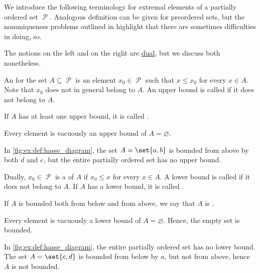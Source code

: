 \begin{definition}\label{def:partially_ordered_set_extremal_points}
  We introduce the following terminology for extremal elements of a partially ordered set \( \mscrP \). Analogous definition can be given for preordered sets, but the nonuniqueness problems outlined in  highlight that there are sometimes difficulties in doing, so.

  The notions on the left and on the right are \hyperref[def:partially_ordered_set/duality]{dual}, but we discuss both nonetheless.

  \begin{thmenum}
    \begin{minipage}[t]{0.45\textwidth}
      An  for the set \( A \subseteq \mscrP \) is an element \( x_0 \in \mscrP \) such that \( x \leq x_0 \) for every \( x \in A \). Note that \( x_0 \) does not in general belong to \( A \). An upper bound is called  if it does not belong to \( A \).

      If \( A \) has at least one upper bound, it is called .

      Every element is vacuously an upper bound of \( A = \varnothing \).

      In \cref{fig:ex:def:hasse_diagram}, the set \( A = \set{ a, b } \) is bounded from above by both \( d \) and \( e \), but the entire partially ordered set has no upper bound.
    \end{minipage}
    \hspace{0.02\textwidth}
    \begin{minipage}[t]{0.45\textwidth}
      Dually, \( x_0 \in \mscrP \) is a  of \( A \) if \( x_0 \leq x \) for every \( x \in A \). A lower bound is called  if it does not belong to \( A \). If \( A \) has a lower bound, it is called .

      If \( A \) is bounded both from below and from above, we say that \( A \) is .

      Every element is vacuously a lower bound of \( A = \varnothing \). Hence, the empty set is bounded.

      In \cref{fig:ex:def:hasse_diagram}, the entire partially ordered set has no lower bound. The set \( A = \set{ c, d } \) is bounded from below by \( a \), but not from above, hence \( A \) is not bounded.
    \end{minipage}


\end{thmenum}
\end{definition}

